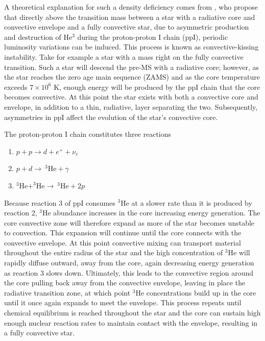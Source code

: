 A theoretical explanation for such a density deficiency comes from
\citet{van2012}, who propose that directly above the transition mass between a
star with a radiative core and convective envelope and a fully convective star,
due to asymmetric production and destruction of He$^{3}$ during the
proton-proton I chain (ppI), periodic luminosity variations can be induced.
This process is known as convective-kissing instability.  Take for example a
star with a mass right on the fully convective transition.  Such a star will
descend the pre-MS with a radiative core; however, as the star reaches the zero
age main sequence (ZAMS) and as the core temperature exceeds $7\times 10^{6}$
K, enough energy will be produced by the ppI chain that the core becomes
convective. At this point the star exists with both a convective core and
envelope, in addition to a thin, radiative, layer separating the two.
Subsequently, asymmetries in ppI affect the evolution of the star's convective
core.

The proton-proton I chain constitutes three reactions 
\begin{enumerate} 
	\item $p + p \longrightarrow d + e^{+} + \nu_{e}$
	\item $p + d \longrightarrow \ ^{3}\text{He} + \gamma$
	\item $^{3}\text{He} + ^{3}\text{He} \longrightarrow \ ^{3}\text{He} + 2p$ 
\end{enumerate} 
Because reaction 3 of ppI consumes $^{3}$He at a slower rate than it is
produced by reaction 2, $^{3}$He abundance increases in the core increasing
energy generation. The core convective zone will therefore expand as more of
the star becomes unstable to convection. This expansion will continue until the
core connects with the convective envelope. At this point convective mixing can
transport material throughout the entire radius of the star and the high
concentration of $^{3}$He will rapidly diffuse outward, away from the core,
again decreasing energy generation as reaction 3 slows down. Ultimately, this
leads to the convective region around the core pulling back away from the
convective envelope, leaving in place the radiative transition zone, at which
point $^{3}$He concentrations build up in the core until it once again expands to
meet the envelope.  This process repeats until chemical equilibrium is reached
throughout the star and the core can sustain high enough nuclear reaction rates
to maintain contact with the envelope, resulting in a fully convective star.


